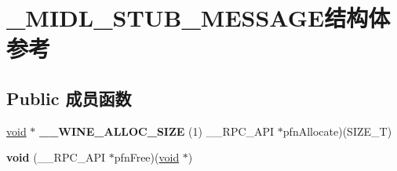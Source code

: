 \hypertarget{struct___m_i_d_l___s_t_u_b___m_e_s_s_a_g_e}{}\section{\+\_\+\+M\+I\+D\+L\+\_\+\+S\+T\+U\+B\+\_\+\+M\+E\+S\+S\+A\+G\+E结构体 参考}
\label{struct___m_i_d_l___s_t_u_b___m_e_s_s_a_g_e}
\subsection*{Public 成员函数}
\begin{DoxyCompactItemize}
\item 
\mbox{\label{struct___m_i_d_l___s_t_u_b___m_e_s_s_a_g_e_a72eb5ac12f69224fc4324a07fb87b8a9}} 
\hyperlink{interfacevoid}{void} $\ast$ {\bfseries \+\_\+\+\_\+\+W\+I\+N\+E\+\_\+\+A\+L\+L\+O\+C\+\_\+\+S\+I\+ZE} (1) \+\_\+\+\_\+\+R\+P\+C\+\_\+\+A\+PI $\ast$pfn\+Allocate)(S\+I\+Z\+E\+\_\+T)
\item 
\mbox{\label{struct___m_i_d_l___s_t_u_b___m_e_s_s_a_g_e_a900eb6f31c126a01ba446ab5d495688d}} 
{\bfseries void} (\+\_\+\+\_\+\+R\+P\+C\+\_\+\+A\+PI $\ast$pfn\+Free)(\hyperlink{interfacevoid}{void} $\ast$)
\end{DoxyCompactItemize}
